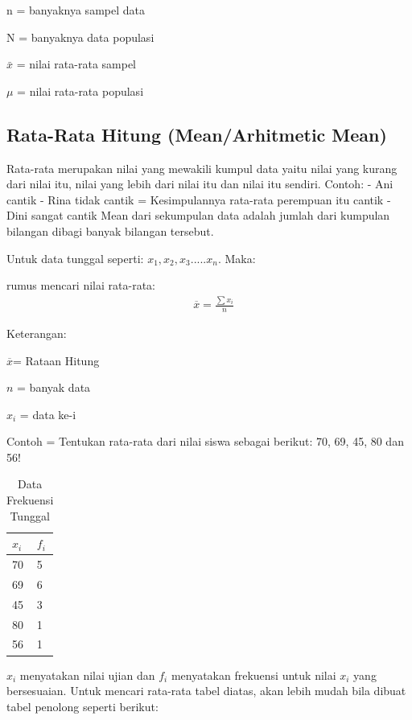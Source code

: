\documentclass[11pt,fleqn]{book} %
\begin{document}
{n = banyaknya sampel data 

N = banyaknya data populasi 

$\bar x$ = nilai rata-rata sampel

$\mu$ = nilai rata-rata populasi


\subsection{Rata-Rata Hitung (Mean/Arhitmetic Mean)}

Rata-rata merupakan nilai yang mewakili kumpul data yaitu nilai yang kurang dari nilai itu, nilai yang lebih dari nilai itu dan nilai itu sendiri. 
Contoh:
-	Ani cantik
-	Rina tidak cantik		=      Kesimpulannya rata-rata perempuan itu cantik
-	Dini  sangat cantik          
Mean dari sekumpulan data adalah jumlah dari kumpulan bilangan dibagi banyak bilangan tersebut. 

Untuk data tunggal seperti: $x_{1}, x_{2}, x_{3}.....x_{n} $. Maka:

\begin{theorem}[Mean]
rumus mencari nilai rata-rata:
\begin{align}
& \overline{x} = \frac{\sum x_{i}}{n}
\end{align}
\end{theorem}

Keterangan:
	 
$\overline{x}$= Rataan Hitung
		 
$n$ = banyak data 

$x_{i}$ = data ke-i

Contoh = Tentukan rata-rata dari nilai siswa sebagai berikut: 70, 69, 45, 80 dan 56!

\begin{table}[h]
\centering
\begin{tabular}{l l}
\toprule
\textbf{$x_{i}$} & \textbf{$f_{i}$}\\
\midrule
70 & 5 \\
69 & 6 \\
45 & 3 \\
80 & 1 \\
56 & 1 \\
\bottomrule
\end{tabular}
\caption{Data Frekuensi Tunggal}
\end{table}

$x_{i}$ menyatakan nilai ujian dan $f_{i}$ menyatakan frekuensi untuk nilai $x_{i}$ yang bersesuaian. Untuk mencari rata-rata tabel diatas, akan lebih mudah bila dibuat tabel penolong seperti berikut:


}
\end{document}
